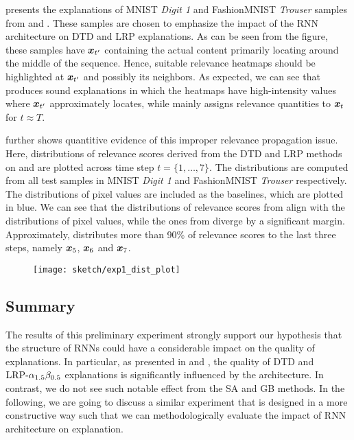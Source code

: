 \addfigure{\ref{fig:class_1_comparison}} presents the explanations of MNIST \textit{Digit 1} and FashionMNIST \textit{Trouser} samples from  and . These samples are chosen to emphasize the impact of the RNN architecture on DTD and LRP explanations. As can be seen from the figure, these samples have $\boldsymbol{x}_{t'}$ containing the actual content primarily locating around the middle of the sequence. Hence, suitable relevance heatmaps should be highlighted at $\boldsymbol{x}_{t'}$ and possibly its neighbors.  As expected, we can see that  produces sound explanations in which the heatmaps have high-intensity values where $\boldsymbol{x}_{t'}$ approximately locates, while  mainly assigns relevance quantities to $\boldsymbol{x}_{t}$ for $t \approx T$. 

\addfigure{\ref{fig:exp1_dist_plot}} further shows quantitive evidence of this improper relevance propagation issue. Here, distributions of relevance scores derived from the DTD and LRP methods on  and  are plotted across time step $t = \{ 1, \dots, 7 \}$. The distributions are computed from all test samples in MNIST \textit{Digit 1} and FashionMNIST \textit{Trouser} respectively. The distributions of pixel values are included as the baselines, which are plotted in blue.  We can see that the distributions of relevance scores from  align with the distributions of pixel values, while  the ones from   diverge by a significant margin. Approximately,  distributes more than 90\% of relevance scores to the last three steps, namely $\boldsymbol{x}_5$, $\boldsymbol{x}_6$ and $\boldsymbol{x}_7$.


 \begin{figure}[!htb]
\centering
\texttt{[image: sketch/exp1\_dist\_plot]}
\label{fig:exp1_dist_plot}
\end{figure}

\subsection{Summary}
The results of this preliminary experiment strongly support our hypothesis that the structure of RNNs could have a considerable impact on the quality of explanations.  In particular,  as presented in \addfigure{\ref{fig:class_1_comparison}} and \addfigure{\ref{fig:exp1_dist_plot}}, the quality of DTD and $\text{LRP-}\alpha_{1.5}\beta_{0.5}$ explanations is significantly influenced by the architecture. In contrast, we do not see such notable effect from the SA and GB methods.  In the following, we are going to discuss a similar experiment that is designed in a more constructive way such that we can methodologically evaluate the impact of RNN architecture on explanation.


